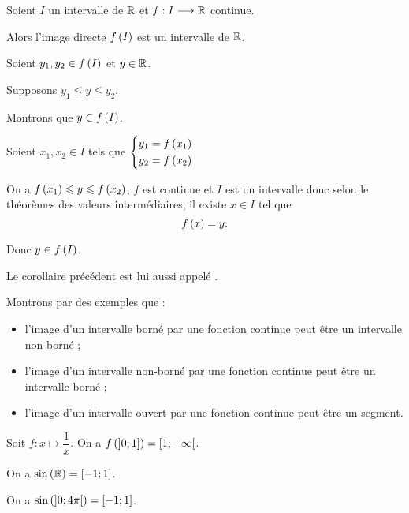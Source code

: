 \begin{cor}
Soient \(I\) un intervalle de \(\mathbb{R}\) et \(f:I\longrightarrow\mathbb{R}\) continue.

Alors l'image directe \(f\left(I\right)\) est un intervalle de \(\mathbb{R}\).
\end{cor}

\begin{dem}
Soient \(y_1,y_2\in f\left(I\right)\) et \(y\in\mathbb{R}\).

Supposons \(y_1\leq y\leq y_2\).

Montrons que \(y\in f\left(I\right)\).

Soient \(x_1,x_2\in I\) tels que \(\begin{dcases}y_1=f\left(x_1\right) \\ y_2=f\left(x_2\right)\end{dcases}\)

On a \(f\left(x_1\right)\leqslant y\leqslant f\left(x_2\right)\), \(f\) est continue et \(I\) est un intervalle donc selon le théorèmes des valeurs intermédiaires, il existe \(x\in I\) tel que \[f\left(x\right)=y.\]

Donc \(y\in f\left(I\right)\).
\end{dem}

\begin{rem}
Le corollaire précédent est lui aussi appelé .
\end{rem}

\begin{ex}
Montrons par des exemples que :

\begin{itemize}
\item l'image d'un intervalle borné par une fonction continue peut être un intervalle non-borné ; \\

\item l'image d'un intervalle non-borné par une fonction continue peut être un intervalle borné ; \\

\item l'image d'un intervalle ouvert par une fonction continue peut être un segment.
\end{itemize}

Soit \(f:x\mapsto\dfrac{1}{x}\). On a \(f\left(\left]0;1\right]\right)=\left[1;+\infty\right[\).

On a \(\sin\left(\mathbb{R}\right)=\left[-1;1\right]\).

On a \(\sin\left(\left]0;4\pi\right[\right)=\left[-1;1\right]\).
\end{ex}

